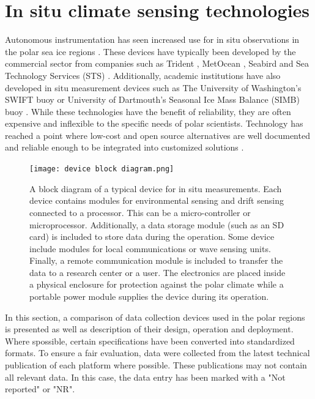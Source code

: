 \newpage
\section{In situ climate sensing technologies}

Autonomous instrumentation has seen increased use for in situ observations in the polar sea ice regions \cite{kennicutt2016delivering}. These devices have typically  been developed by the commercial sector \cite{rabault2017measurements} from companies such as Trident \cite{trident}, MetOcean \cite{uptempo}, Seabird \cite{seabird2021website} and Sea Technology Services (STS) \cite{sts2021website}. Additionally, academic institutions have also developed in situ measurement devices such as The University of Washington's SWIFT buoy \cite{thomson2012wave} or University of Dartmouth's Seasonal Ice Mass Balance (SIMB) buoy \cite{polashenski2011seasonal}. While these technologies have the benefit of reliability, they are often expensive \cite{rabault2017measurements} and inflexible to the specific needs of polar scientists. Technology has reached a point where low-cost and open source alternatives are well documented and reliable enough to be integrated into customized solutions \cite{rabault2019open}.\par 

\begin{figure}[H]
	\centering
	\texttt{[image: device block diagram.png]}
	\caption{A block diagram of a typical device for in situ measurements. Each device contains modules for environmental sensing and drift sensing connected to a processor. This can be a micro-controller or microprocessor. Additionally, a data storage module (such as an SD card) is included to store data during the operation. Some device include modules for local communications or wave sensing units. Finally, a remote communication module is included to transfer the data to a research center or a user. The electronics are placed inside a physical enclosure for protection against the polar climate while a portable power module supplies the device during its operation.}
	\label{fig:devblockdiag}
\end{figure}

In this section, a comparison of data collection devices used in the polar regions is presented as well as  description of their design, operation and deployment. Where spossible, certain specifications have been converted into standardized formats. To ensure a fair evaluation, data were collected from the latest technical publication of each platform where possible. These publications may not contain all relevant data. In this case, the data entry has been marked with a "Not reported" or "NR". 


